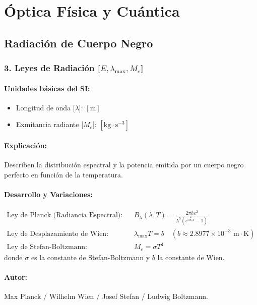 \documentclass[12pt,a4paper]{article}
\begin{document}
\section{Óptica Física y Cuántica}

\subsection{Radiación de Cuerpo Negro}

\subsubsection*{3. Leyes de Radiación [$E, \lambda_{\max}, M_e$]}
\paragraph*{Unidades básicas del SI:}
\begin{itemize}
    \item Longitud de onda [$\lambda$]: $[\text{m}]$
    \item Exmitancia radiante [$M_e$]: $[\text{kg}\cdot\text{s}^{-3}]$
\end{itemize}
\paragraph*{Explicación:} Describen la distribución espectral y la potencia emitida por un cuerpo negro perfecto en función de la temperatura.
\paragraph*{Desarrollo y Variaciones:}
\begin{align*}
\text{Ley de Planck (Radiancia Espectral):} \quad & B_\lambda(\lambda, T) = \frac{2 \pi h c^2}{\lambda^5 \left(e^{\frac{h c}{\lambda k_B T}} - 1\right)} \\
\text{Ley de Desplazamiento de Wien:} \quad & \lambda_{\max} T = b \quad (b \approx 2.8977 \times 10^{-3} \text{ m}\cdot\text{K}) \\
\text{Ley de Stefan-Boltzmann:} \quad & M_e = \sigma T^4
\end{align*}
donde $\sigma$ es la constante de Stefan-Boltzmann y $b$ la constante de Wien.
\paragraph*{Autor:} Max Planck / Wilhelm Wien / Josef Stefan / Ludwig Boltzmann.
\end{document}
